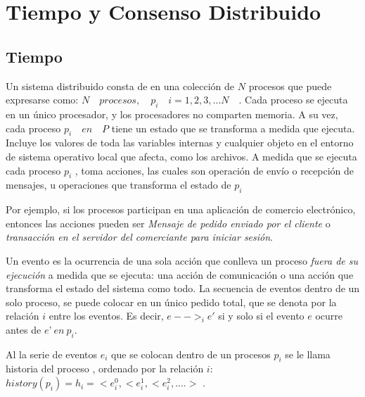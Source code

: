 
\chapter{Tiempo y Consenso Distribuido}
\label{ch:Tiempo y Consenso Distribuido}

 
 \section{Tiempo}
  
 
 
   Un sistema distribuido consta \cite{Coulouris2011} de en una colección   de $N$ procesos que puede expresarse como:  $N \quad procesos,  \quad p_{i} \quad  i = 1, 2,3,... N\quad  $.
 Cada proceso se ejecuta en un único procesador, y los procesadores no comparten memoria. 
 A su vez, cada proceso $p_{i} \quad en \quad P$  tiene un estado que se transforma a medida que ejecuta.  Incluye los valores de toda las variables internas y cualquier objeto en el entorno de sistema operativo local que afecta, como los archivos. 
 A medida que se ejecuta cada proceso  $p_{i}$ , toma acciones, las cuales son operación de envío o recepción de mensajes, u operaciones que transforma el estado de $p_{i}$
 
 Por ejemplo, si los procesos participan en una aplicación de comercio electrónico, entonces las acciones  pueden ser \textit{Mensaje de pedido enviado por el cliente} o \textit{transacción en el servidor del comerciante para iniciar sesión}.	
 
 Un \gls{evento} es la ocurrencia de una sola acción que conlleva un proceso \textit{fuera de su ejecuci\'on}  a medida que se ejecuta: una acción de comunicación o una acción que transforma el estado del sistema como todo.
 La secuencia de eventos dentro de un solo proceso,  se puede colocar en un único pedido total, que se denota por la relación  $ i $ entre los eventos. Es decir, $e-->_{i}e'$  si  y  solo  si  el  evento  $e$  	ocurre antes de $e’ \ en \ p_{i}$. 
 
Al la serie de eventos $e_{i}$  que se colocan dentro de un procesos $p_{i}$ se le llama \gls{historia del proceso} \cite{Coulouris2011} , ordenado  por la relación ${i}:$ \\  $history(p_{i})  = h_{i}  = <e_{i}^{0},  <e_{i}^{1},  <e_{i}^{2}, ....>  $ .

